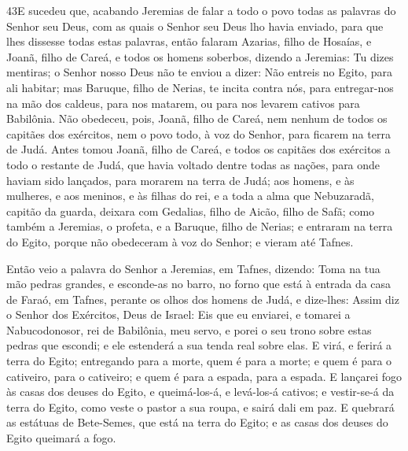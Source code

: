 \lettrine{43} E sucedeu que, acabando Jeremias de falar a todo
o povo todas as palavras do Senhor seu Deus, com as quais o Senhor
seu Deus lho havia enviado, para que lhes dissesse todas estas
palavras, então falaram Azarias, filho de Hosaías, e Joanã,
filho de Careá, e todos os homens soberbos, dizendo a Jeremias: Tu
dizes mentiras; o Senhor nosso Deus não te enviou a dizer: Não
entreis no Egito, para ali habitar; mas Baruque, filho de
Nerias, te incita contra nós, para entregar-nos na mão dos caldeus,
para nos matarem, ou para nos levarem cativos para Babilônia.
Não obedeceu, pois, Joanã, filho de Careá, nem nenhum de todos
os capitães dos exércitos, nem o povo todo, à voz do Senhor, para
ficarem na terra de Judá. Antes tomou Joanã, filho de Careá, e
todos os capitães dos exércitos a todo o restante de Judá, que havia
voltado dentre todas as nações, para onde haviam sido lançados, para
morarem na terra de Judá; aos homens, e às mulheres, e aos
meninos, e às filhas do rei, e a toda a alma que Nebuzaradã, capitão
da guarda, deixara com Gedalias, filho de Aicão, filho de Safã; como
também a Jeremias, o profeta, e a Baruque, filho de Nerias; e
entraram na terra do Egito, porque não obedeceram à voz do Senhor; e
vieram até Tafnes.

Então veio a palavra do Senhor a Jeremias, em Tafnes, dizendo:
Toma na tua mão pedras grandes, e esconde-as no barro, no forno
que está à entrada da casa de Faraó, em Tafnes, perante os olhos dos
homens de Judá, e dize-lhes: Assim diz o Senhor dos
Exércitos, Deus de Israel: Eis que eu enviarei, e tomarei a
Nabucodonosor, rei de Babilônia, meu servo, e porei o seu trono
sobre estas pedras que escondi; e ele estenderá a sua tenda real
sobre elas. E virá, e ferirá a terra do Egito; entregando
para a morte, quem é para a morte; e quem é para o cativeiro, para o
cativeiro; e quem é para a espada, para a espada. E lançarei
fogo às casas dos deuses do Egito, e queimá-los-á, e levá-los-á
cativos; e vestir-se-á da terra do Egito, como veste o pastor a sua
roupa, e sairá dali em paz. E quebrará as estátuas de
Bete-Semes, que está na terra do Egito; e as casas dos deuses do
Egito queimará a fogo.

\medskip


